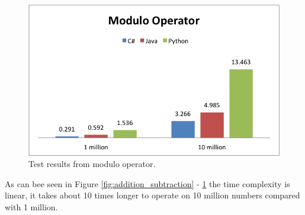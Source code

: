 \begin{figure}[h]
	\centering
	\includegraphics[width=0.48\linewidth]{chapters/media/modulo.png}
	\caption{Test results from modulo operator.}
	\label{fig:modulo}
\end{figure}

As can bee seen in Figure \ref{fig:addition_subtraction} - \ref{fig:modulo} the time complexity is linear, it takes about 10 times longer to operate on 10 million numbers compared with 1 million.  
